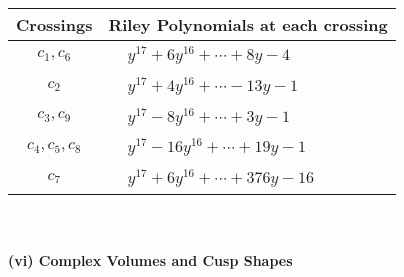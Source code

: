 \documentclass[1p]{elsarticle_modified}
\theoremstyle{definition}
\begin{document}
\begin{tabular}{m{50pt}|m{274pt}}
Crossings & \hspace{64pt}Riley Polynomials at each crossing \\
\hline $$\begin{aligned}c_{1},c_{6}\end{aligned}$$&$\begin{aligned}
&y^{17}+6 y^{16}+\cdots+8 y-4
\end{aligned}$\\
\hline $$\begin{aligned}c_{2}\end{aligned}$$&$\begin{aligned}
&y^{17}+4 y^{16}+\cdots-13 y-1
\end{aligned}$\\
\hline $$\begin{aligned}c_{3},c_{9}\end{aligned}$$&$\begin{aligned}
&y^{17}-8 y^{16}+\cdots+3 y-1
\end{aligned}$\\
\hline $$\begin{aligned}c_{4},c_{5},c_{8}\end{aligned}$$&$\begin{aligned}
&y^{17}-16 y^{16}+\cdots+19 y-1
\end{aligned}$\\
\hline $$\begin{aligned}c_{7}\end{aligned}$$&$\begin{aligned}
&y^{17}+6 y^{16}+\cdots+376 y-16
\end{aligned}$\\
\hline
\end{tabular}\\~\\
\newpage\flushleft \textbf{(vi) Complex Volumes and Cusp Shapes}
\end{document}
